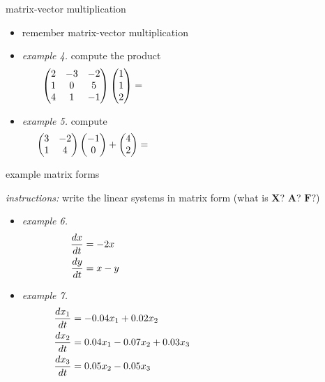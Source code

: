 \documentclass[urlcolor=blue,dvipsnames]{beamer}
\newcommand{\bA}{\mathbf{A}}
\newcommand{\bF}{\mathbf{F}}
\newcommand{\bX}{\mathbf{X}}
\begin{document}
\begin{frame}{matrix-vector multiplication}

\begin{itemize}
\item remember matrix-vector multiplication
\item \emph{example 4.}  compute the product
    $$\begin{pmatrix} 2 & -3 & -2 \\ 1 & 0 & 5 \\ 4 & 1 & -1\end{pmatrix} \begin{pmatrix} 1 \\ 1 \\ 2 \end{pmatrix} = \hspace{70mm}$$

\vspace{15mm}
\item \emph{example 5.}  compute
    $$\begin{pmatrix} 3 & -2 \\ 1 & 4 \end{pmatrix} \begin{pmatrix} -1 \\ 0 \end{pmatrix} +  \begin{pmatrix} 4 \\ 2 \end{pmatrix} = \hspace{70mm}$$
\end{itemize}

\vspace{15mm}
\end{frame}


\begin{frame}{example matrix forms}

\small
\noindent \emph{instructions:} write the linear systems in matrix form (what is $\bX$? $\bA$? $\bF?$)
\begin{itemize}
\item \emph{example 6.}
\begin{align*}
\frac{dx}{dt} &= - 2 x \hspace{70mm} \\
\frac{dy}{dt} &= x - y
\end{align*}
\item \emph{example 7.}
\begin{align*}
\frac{dx_1}{dt} &= -0.04 x_1 + 0.02 x_2 \hspace{60mm} \\
\frac{dx_2}{dt} &= 0.04 x_1 - 0.07 x_2 + 0.03 x_3 \\
\frac{dx_3}{dt} &= 0.05 x_2 - 0.05 x_3
\end{align*}
\end{itemize}
\end{frame}
\end{document}
